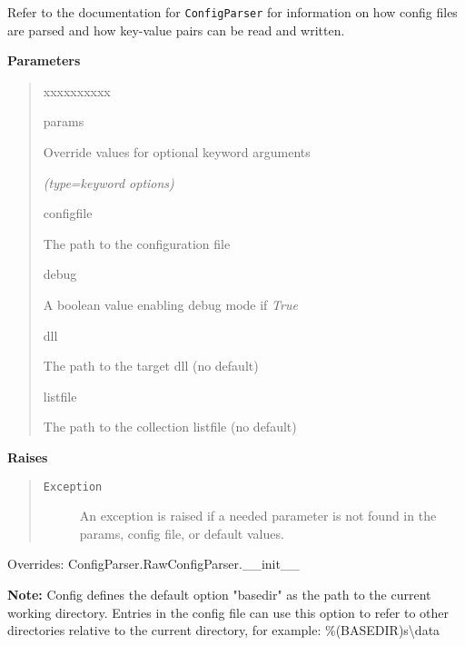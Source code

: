 \begin{boxedminipage}{\funcwidth}
    Refer to the documentation for \texttt{ConfigParser} for information on
    how config files are parsed and how key-value pairs can be read and 
    written.

\setlength{\parskip}{1ex}
      \textbf{Parameters}
      \vspace{-1ex}

      \begin{quote}
        \begin{Ventry}{xxxxxxxxxx}

          \item[params]

          Override values for optional keyword arguments

            {\it (type=keyword options)}

          \item[configfile]

          The path to the configuration file

          \item[debug]

          A boolean value enabling debug mode if \textit{True}

          \item[dll]

          The path to the target dll (no default)

          \item[listfile]

          The path to the collection listfile (no default)

        \end{Ventry}

      \end{quote}

      \textbf{Raises}
    \vspace{-1ex}

      \begin{quote}
        \begin{description}

          \item[\texttt{Exception}]

          An exception is raised if a needed parameter is not found in the 
          params, config file, or default values.

        \end{description}

      \end{quote}

      Overrides: ConfigParser.RawConfigParser.\_\_init\_\_

\textbf{Note:} Config defines the default option "basedir" as the path to the current 
working directory. Entries in the config file can use this option to refer 
to other directories relative to the current directory, for example: 
\%(BASEDIR)s{\textbackslash}data



    \end{boxedminipage}

